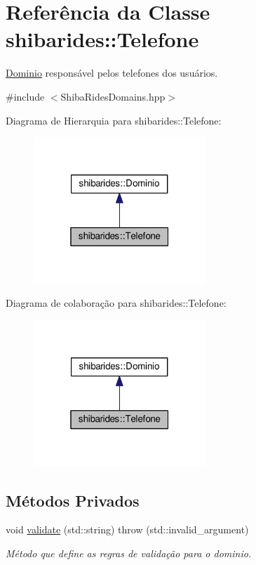 \hypertarget{classshibarides_1_1Telefone}{}\section{Referência da Classe shibarides\+:\+:Telefone}
\label{classshibarides_1_1Telefone}


\hyperlink{classshibarides_1_1Dominio}{Dominio} responsável pelos telefones dos usuários.  




{\ttfamily \#include $<$Shiba\+Rides\+Domains.\+hpp$>$}



Diagrama de Hierarquia para shibarides\+:\+:Telefone\+:\nopagebreak
\begin{figure}[H]
\begin{center}
\leavevmode
\includegraphics[width=184pt]{classshibarides_1_1Telefone__inherit__graph}
\end{center}
\end{figure}


Diagrama de colaboração para shibarides\+:\+:Telefone\+:\nopagebreak
\begin{figure}[H]
\begin{center}
\leavevmode
\includegraphics[width=184pt]{classshibarides_1_1Telefone__coll__graph}
\end{center}
\end{figure}
\subsection*{Métodos Privados}
\begin{DoxyCompactItemize}
\item 
void \hyperlink{classshibarides_1_1Telefone_aa798f740a30faef8d2599950284ded33}{validate} (std\+::string)  throw (std\+::invalid\+\_\+argument)
\begin{DoxyCompactList}\small\item\em Método que define as regras de validação para o dominio. \end{DoxyCompactList}\end{DoxyCompactItemize}
